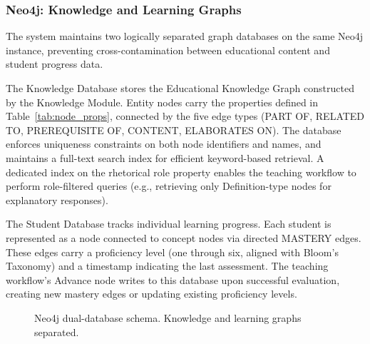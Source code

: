 \subsubsection{Neo4j: Knowledge and Learning Graphs}

The system maintains two logically separated graph databases on the same Neo4j instance, preventing cross-contamination between educational content and student progress data.

The Knowledge Database stores the Educational Knowledge Graph constructed by the Knowledge Module. Entity nodes carry the properties defined in Table~\ref{tab:node_props}, connected by the five edge types (PART OF, RELATED TO, PREREQUISITE OF, CONTENT, ELABORATES ON). The database enforces uniqueness constraints on both node identifiers and names, and maintains a full-text search index for efficient keyword-based retrieval. A dedicated index on the rhetorical role property enables the teaching workflow to perform role-filtered queries (e.g., retrieving only Definition-type nodes for explanatory responses).

The Student Database tracks individual learning progress. Each student is represented as a node connected to concept nodes via directed MASTERY edges. These edges carry a proficiency level (one through six, aligned with Bloom's Taxonomy) and a timestamp indicating the last assessment. The teaching workflow's Advance node writes to this database upon successful evaluation, creating new mastery edges or updating existing proficiency levels.

\begin{figure}[H]
\centering
{}
    \vspace{12pt}\caption{Neo4j dual-database schema. Knowledge and learning graphs separated.}\label{fig:neo4j_schema}
\end{figure}


